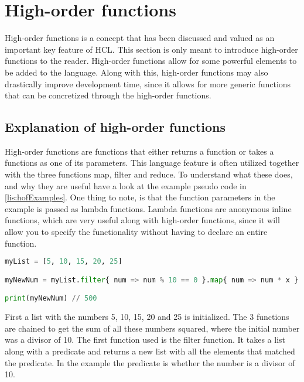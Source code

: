 \section{High-order functions}
High-order functions is a concept that has been discussed and valued as an important key feature of HCL.
This section is only meant to introduce high-order functions to the reader.
High-order functions allow for some powerful elements to be added to the language.
Along with this, high-order functions may also drastically improve development time, since it allows for more generic functions that can be concretized through the high-order functions.

\subsection{Explanation of high-order functions}
High-order functions are functions that either returns a function or takes a functions as one of its parameters. 
This language feature is often utilized together with the three functions map, filter and reduce. 
To understand what these does, and why they are useful have a look at the example pseudo code in \ref{lis:hofExamples}. 
One thing to note, is that the function parameters in the example is passed as lambda functions. 
Lambda functions are anonymous inline functions, which are very useful along with high-order functions, since it will allow you to specify the functionality without having to declare an entire function.

\begin{lstlisting}[language=Python,label=lis:hofExamples,caption=An example of the map{,} filter and reduce functions.,firstnumber=1]
myList = [5, 10, 15, 20, 25]

myNewNum = myList.filter{ num => num % 10 == 0 }.map{ num => num * x }.reduce{ sumOfNums, num => sumOfNums + num }

print(myNewNum) // 500
\end{lstlisting}

First a list with the numbers 5, 10, 15, 20 and 25 is initialized. 
The 3 functions are chained to get the sum of all these numbers squared, where the initial number was a divisor of 10.
The first function used is the filter function. 
It takes a list along with a predicate and returns a new list with all the elements that matched the predicate.
In the example the predicate is whether the number is a divisor of 10.

